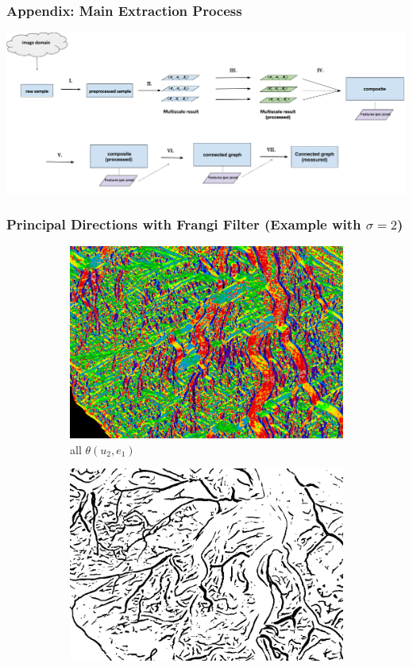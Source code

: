 \documentclass[9pt,notes]{beamer}
\begin{document}
\begin{frame}
	\frametitle{Appendix: Main Extraction Process}
	\includegraphics[width=\textwidth]{main_flowchart}
\end{frame}
\begin{frame}
	\frametitle{Principal Directions with Frangi Filter (Example with  $\sigma=2$)}
	\begin{figure}
		\centering
		\begin{subfigure}[b]{0.30\textwidth}
			\includegraphics[width=\textwidth]{02pdall-inset}
			\caption{all $\theta(u_2 , e_1)$}
		\end{subfigure}
		\begin{subfigure}[b]{0.30\textwidth}
			\includegraphics[width=\textwidth]{02bw-inset}

\end{subfigure}
\end{figure}
\end{frame}
\end{document}
